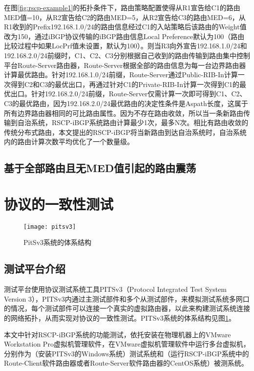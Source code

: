 在图\ref{fig:rscp-example1}的拓扑条件下，路由策略配置使得从R1宣告给C1的路由MED值=10，从R2宣告给C2的路由MED=5，从R2宣告给C3的路由MED=6，从R1收到的Prefix192.168.1.0/24的路由信息经过C1的入站策略后该路由的Weight值改为150，通过iBGP协议传输的iBGP路由信息Local Preference默认为100（路由比较过程中如果LocPrf值未设置，默认为100）。则当R3向外宣告192.168.1.0/24和192.168.2.0/24前缀时，C1、C2、C3分别根据自己收到的路由传输到路由集中控制平台Route-Server路由器，Route-Server根据全部的路由信息为每一台边界路由器计算最优路由。针对192.168.1.0/24前缀，Route-Server通过Public-RIB-In计算一次得到C2和C3的最优出口，再通过针对C1的Private-RIB-In计算一次得到C1的最优出口。针对192.168.2.0/24前缀，Route-Server仅需计算一次即可得到C1、C2、C3的最优路由，因为192.168.2.0/24最优路由的决定性条件是Aspath长度，这属于所有边界路由器相同的可比路由属性。因为不存在路由收敛，所以当一条新路由传输到自治系统，RSCP-iBGP系统路由计算最少1次，最多N次。相比有路由收敛的传统分布式路由，本文提出的RSCP-iBGP将当新路由到达自治系统时，自治系统内的路由计算次数平均优化了一个数量级。

\subsection{基于全部路由且无MED值引起的路由震荡}








\section{协议的一致性测试}

\begin{figure}
  \centering
  \texttt{[image: pitsv3]}
  \caption{PitSv3系统的体系结构\cite{journals_chinaf_YinWJS08}}
  \label{fig:pitsv3}
\end{figure}

\subsection{测试平台介绍}
测试平台使用协议测试系统工具PITSv3\cite{journals_chinaf_YinWJS08}（Protocol Integrated Test System Version 3），PITSv3内通过主测试部件和多个从测试部件，来模拟测试系统多网口的情况，每个测试部件可以连接一个真实的虚拟路由器，以此来构建测试系统连接的网络拓扑，从而实现对协议的一致性测试。PITSv3系统的体系结构见图\ref{fig:pitsv3}。

本文中针对RSCP-iBGP系统的功能测试，依托安装在物理机器上的VMware Workstation Pro虚拟机管理软件，在VMware虚拟机管理软件中运行多台虚拟机，分别作为（安装PITSv3的Windows系统）测试系统和（运行RSCP-iBGP系统中的Route-Client软件路由器或者Route-Server软件路由器的CentOS系统）被测系统\cite{pitsv3}。

